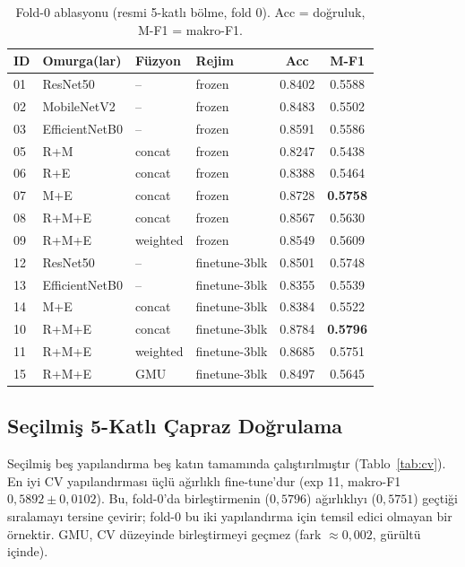 \begin{table}[H]
\centering
\caption{Fold-0 ablasyonu (resmi 5-katlı bölme, fold 0). Acc = doğruluk,
M-F1 = makro-F1.}
\label{tab:ablation}
\begin{tabular}{llll cc}
\toprule
ID & Omurga(lar) & Füzyon & Rejim & Acc & M-F1 \\
\midrule
01 & ResNet50        & --       & frozen        & 0.8402 & 0.5588 \\
02 & MobileNetV2     & --       & frozen        & 0.8483 & 0.5502 \\
03 & EfficientNetB0  & --       & frozen        & 0.8591 & 0.5586 \\
05 & R+M             & concat   & frozen        & 0.8247 & 0.5438 \\
06 & R+E             & concat   & frozen        & 0.8388 & 0.5464 \\
07 & M+E             & concat   & frozen        & 0.8728 & \textbf{0.5758} \\
08 & R+M+E           & concat   & frozen        & 0.8567 & 0.5630 \\
09 & R+M+E           & weighted & frozen        & 0.8549 & 0.5609 \\
\midrule
12 & ResNet50        & --       & finetune-3blk & 0.8501 & 0.5748 \\
13 & EfficientNetB0  & --       & finetune-3blk & 0.8355 & 0.5539 \\
14 & M+E             & concat   & finetune-3blk & 0.8384 & 0.5522 \\
10 & R+M+E           & concat   & finetune-3blk & 0.8784 & \textbf{0.5796} \\
11 & R+M+E           & weighted & finetune-3blk & 0.8685 & 0.5751 \\
15 & R+M+E           & GMU      & finetune-3blk & 0.8497 & 0.5645 \\
\bottomrule
\end{tabular}
\end{table}

\subsection{Seçilmiş 5-Katlı Çapraz Doğrulama}
\label{subsec:t2}
Seçilmiş beş yapılandırma beş katın tamamında çalıştırılmıştır
(Tablo~\ref{tab:cv}). En iyi CV yapılandırması üçlü ağırlıklı fine-tune'dur
(exp 11, makro-F1 $0{,}5892 \pm 0{,}0102$). Bu, fold-0'da birleştirmenin
($0{,}5796$) ağırlıklıyı ($0{,}5751$) geçtiği sıralamayı tersine çevirir;
fold-0 bu iki yapılandırma için temsil edici olmayan bir örnektir. GMU, CV
düzeyinde birleştirmeyi geçmez (fark $\approx 0{,}002$, gürültü içinde).

